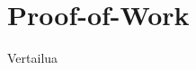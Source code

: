 \section{Proof-of-Work\label{spacemint}}
\begin{otherlanguage}{english}

Vertailua

\end{otherlanguage}